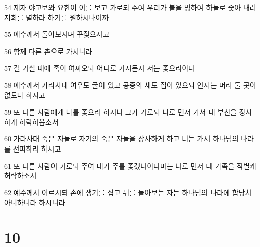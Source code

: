 \par 54 제자 야고보와 요한이 이를 보고 가로되 주여 우리가 불을 명하여 하늘로 좇아 내려 저희를 멸하라 하기를 원하시나이까
\par 55 예수께서 돌아보시며 꾸짖으시고
\par 56 함께 다른 촌으로 가시니라
\par 57 길 가실 때에 혹이 여짜오되 어디로 가시든지 저는 좇으리이다
\par 58 예수께서 가라사대 여우도 굴이 있고 공중의 새도 집이 있으되 인자는 머리 둘 곳이 없도다 하시고
\par 59 또 다른 사람에게 나를 좇으라 하시니 그가 가로되 나로 먼저 가서 내 부친을 장사하게 허락하옵소서
\par 60 가라사대 죽은 자들로 자기의 죽은 자들을 장사하게 하고 너는 가서 하나님의 나라를 전파하라 하시고
\par 61 또 다른 사람이 가로되 주여 내가 주를 좇겠나이다마는 나로 먼저 내 가족을 작별케 허락하소서
\par 62 예수께서 이르시되 손에 쟁기를 잡고 뒤를 돌아보는 자는 하나님의 나라에 합당치 아니하니라 하시니라

\chapter{10}


